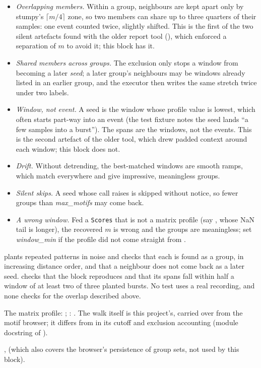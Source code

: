 \begin{itemize}
\item \emph{Overlapping members.} Within a group, neighbours are kept apart only by stumpy's
  $\lceil m/4\rceil$ zone, so two members can share up to three quarters of their samples: one
  event counted twice, slightly shifted. This is the first of the two silent artefacts found with
  the older report tool (), which enforced a separation of $m$ to
  avoid it; this block has it.
\item \emph{Shared members across groups.} The exclusion only stops a window from becoming a later
  \emph{seed}; a later group's neighbours may be windows already listed in an earlier group, and the
  executor then writes the same stretch twice under two labels.
\item \emph{Window, not event.} A seed is the window whose profile value is lowest, which often
  starts part-way into an event (the test fixture notes the seed lands ``a few samples into a
  burst''). The spans are the windows, not the events. This is the second artefact of the older
  tool, which drew padded context around each window; this block does not.
\item \emph{Drift.} Without detrending, the best-matched windows are smooth ramps, which match
  everywhere and give impressive, meaningless groups.
\item \emph{Silent skips.} A seed whose  call raises is skipped without notice,
  so fewer groups than \emph{max\_motifs} may come back.
\item \emph{A wrong window.} Fed a \texttt{Scores} that is not a matrix profile (say
  , whose NaN tail is longer), the recovered $m$ is wrong and the groups
  are meaningless; set \emph{window\_min} if the profile did not come straight from
  .
\end{itemize}

 plants repeated patterns in noise and checks that each is found
as a group, in increasing distance order, and that a neighbour does not come back as a later seed.
 checks that the block reproduces 
and that its spans fall within half a window of at least two of three planted bursts. No test uses
a real recording, and none checks for the overlap described above.

The matrix profile: \citet{yeh2016matrix}; : \citet{law2019stumpy}. The walk
itself is this project's, carried over from the motif browser; it differs from
 in its cutoff and exclusion accounting (module docstring of
).

,  (which also covers the
browser's persistence of group sets, not used by this block).
